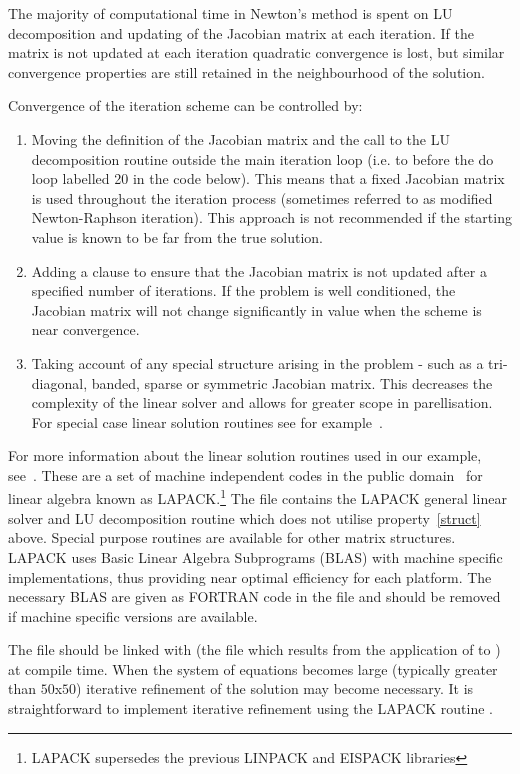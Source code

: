 \documentclass [12pt,twoside]{article}
\begin{document}
The majority of computational time in Newton's method is spent on LU
decomposition and updating of the Jacobian matrix at each iteration. If
the matrix is not updated at each iteration quadratic convergence is lost, but
similar convergence properties are still retained in the neighbourhood of
the solution.

Convergence of the iteration scheme can be controlled by:
\begin{enumerate}
\item Moving the definition of the Jacobian matrix and the call to the LU
decomposition routine outside the main iteration loop (i.e. to before the do loop
labelled 20 in the code below). This means that a fixed Jacobian matrix is used
throughout the iteration process (sometimes referred to as modified Newton-Raphson
iteration). This approach is not recommended if the starting value is known to be
far from the true solution.

\item Adding a clause to ensure that the Jacobian matrix is not updated after
a specified number of iterations. If the problem is well conditioned, the
Jacobian matrix will not change significantly in value when the scheme
is near convergence.

\item Taking account of any special structure arising in the problem -
such as a tri-diagonal, banded, sparse or symmetric Jacobian matrix. This
decreases the complexity of the linear solver and allows for greater scope in
parellisation. For special case linear solution routines see
for example~\cite{lapack,nag}.\label{struct}
\end{enumerate}

For more information about the linear solution routines used in our example,
see~\cite{lapack}. These are a set of machine independent codes in the
public domain~\cite{netlib} for linear algebra known as LAPACK.\footnote{LAPACK
supersedes the previous LINPACK and EISPACK libraries} The file 
contains the LAPACK general linear solver and LU decomposition routine which does
not utilise property~\ref{struct} above. Special purpose routines are available
for other matrix structures. LAPACK uses Basic Linear Algebra Subprograms (BLAS)
with machine specific implementations, thus providing near optimal efficiency for
each platform. The necessary BLAS are given as FORTRAN code in the file
 and should be removed if machine specific versions are available.

The file  should be linked with  (the file which
results from the application of  to ) at compile
time. When the system of equations becomes large (typically greater than
$50$x$50$) iterative refinement of the solution may become necessary. It
is straightforward to implement iterative refinement using the LAPACK
routine .
\end{document}
